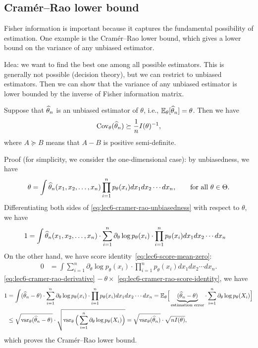 \documentclass[11pt,letterpaper]{article}
\numberwithin{assumption}{lecture}
\numberwithin{theorem}{lecture}
\numberwithin{proposition}{lecture}
\numberwithin{lemma}{lecture}
\numberwithin{claim}{lecture}
\numberwithin{corollary}{lecture}
\numberwithin{definition}{lecture}
\numberwithin{conjecture}{lecture}
\numberwithin{remark}{lecture}
\numberwithin{example}{lecture}
\numberwithin{equation}{lecture}
\begin{document}
\subsection{Cram\'{e}r--Rao lower bound}
Fisher information is important because it captures the fundamental possibility of estimation. One example is the Cram\'{e}r--Rao lower bound, which gives a lower bound on the variance of any unbiased estimator.

Idea: we want to find the best one among all possible estimators. This is generally not possible (decision theory), but we can restrict to unbiased estimators. Then we can show that the variance of any unbiased estimator is lower bounded by the inverse of Fisher information matrix.

\begin{theorem}
  Suppose that $\widehat{\theta}_n$ is an unbiased estimator of $\theta$, i.e., ${\mathbb{E}}_{\theta} [\widehat{\theta}_n] = \theta$. Then we have
  \begin{align*}
    \mathrm{Cov}_{\theta} (\widehat{\theta}_n) \succeq \frac1n I(\theta)^{-1},
  \end{align*}
  where $A \succeq B$ means that $A - B$ is positive semi-definite.
\end{theorem}
Proof (for simplicity, we consider the one-dimensional case): by unbiasedness, we have
\begin{align}
  \theta = \int \widehat{\theta}_n (x_1, x_2, \ldots, x_n) \prod_{i=1}^n p_\theta (x_i) dx_1 dx_2 \cdots dx_n, \qquad \text{for all } \theta \in \Theta.\label{eq:lec6-cramer-rao-unbiasedness}
\end{align}
Differentiating both sides of \eqref{eq:lec6-cramer-rao-unbiasedness} with respect to $\theta$, we have
\begin{align}
  1 &= \int \widehat{\theta}_n (x_1, x_2, \ldots, x_n) \cdot \sum_{i=1}^n \partial_\theta \log p_\theta (x_i) \cdot \prod_{i=1}^n p_\theta (x_i) dx_1 dx_2 \cdots dx_n\label{eq:lec6-cramer-rao-derivative}
\end{align}
On the other hand, we have score identity~\eqref{eq:lec6-score-mean-zero}:
\begin{align}
  0 &= \int \sum_{i=1}^n \partial_\theta \log p_\theta (x_i) \cdot \prod_{i=1}^n p_\theta (x_i) dx_1 dx_2 \cdots dx_n.\label{eq:lec6-cramer-rao-score-identity}
\end{align}
\eqref{eq:lec6-cramer-rao-derivative} $- ~\theta \times$ \eqref{eq:lec6-cramer-rao-score-identity}, we have
\begin{align*}
  1 &= \int (\widehat{\theta}_n - \theta) \cdot \sum_{i=1}^n \partial_\theta \log p_\theta (x_i) \cdot \prod_{i=1}^n p_\theta (x_i) dx_1 dx_2 \cdots dx_n = {\mathbb{E}}_\theta \Big[ \underbrace{(\widehat{\theta}_n - \theta)}_{\text{estimation error}} \cdot \sum_{i=1}^n \partial_\theta \log p_\theta (X_i)  \Big]\\
  &\leq \sqrt{\operatorname{var}_\theta (\widehat{\theta}_n - \theta)} \cdot \sqrt{\operatorname{var}_\theta \Big( \sum_{i=1}^n \partial_\theta \log p_\theta (X_i) \Big)} = \sqrt{\operatorname{var}_\theta (\widehat{\theta}_n)} \cdot \sqrt{n I (\theta)},
\end{align*}
which proves the Cram\'{e}r--Rao lower bound.
\end{document}
